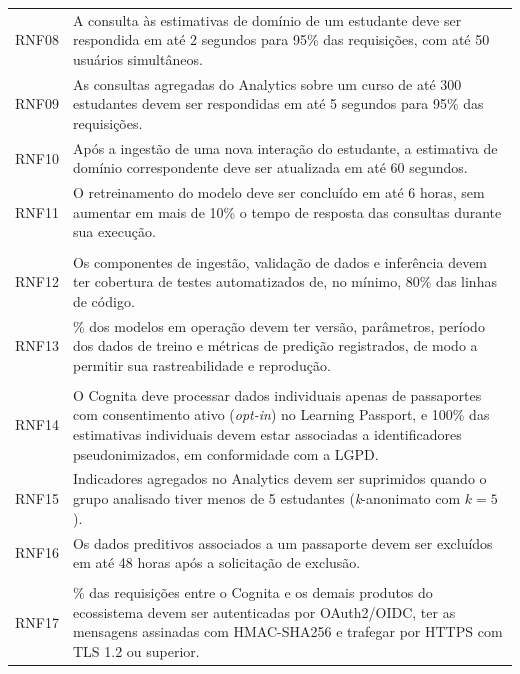 {\begin{longtable}{>{\raggedright\arraybackslash}p{2.0cm}>{\raggedright\arraybackslash}p{11.8cm}}
\hline
\multicolumn{2}{l}{\textbf{Desempenho}} \\
\hline
RNF08 & A consulta às estimativas de domínio de um estudante deve ser respondida em até 2 segundos para 95\% das requisições, com até 50 usuários simultâneos. \\
\hline
RNF09 & As consultas agregadas do Analytics sobre um curso de até 300 estudantes devem ser respondidas em até 5 segundos para 95\% das requisições. \\
\hline
RNF10 & Após a ingestão de uma nova interação do estudante, a estimativa de domínio correspondente deve ser atualizada em até 60 segundos. \\
\hline
RNF11 & O retreinamento do modelo deve ser concluído em até 6 horas, sem aumentar em mais de 10\% o tempo de resposta das consultas durante sua execução. \\
\hline
\multicolumn{2}{l}{\textbf{Suportabilidade}} \\
\hline
RNF12 & Os componentes de ingestão, validação de dados e inferência devem ter cobertura de testes automatizados de, no mínimo, 80\% das linhas de código. \\
\hline
RNF13 & 100\% dos modelos em operação devem ter versão, parâmetros, período dos dados de treino e métricas de predição registrados, de modo a permitir sua rastreabilidade e reprodução. \\
\hline
\multicolumn{2}{l}{\textbf{Restrições de Projeto}} \\
\hline
RNF14 & O Cognita deve processar dados individuais apenas de passaportes com consentimento ativo (\textit{opt-in}) no Learning Passport, e 100\% das estimativas individuais devem estar associadas a identificadores pseudonimizados, em conformidade com a LGPD. \\
\hline
RNF15 & Indicadores agregados no Analytics devem ser suprimidos quando o grupo analisado tiver menos de 5 estudantes (\textit{k}-anonimato com $k = 5$). \\
\hline
RNF16 & Os dados preditivos associados a um passaporte devem ser excluídos em até 48 horas após a solicitação de exclusão. \\
\hline
\multicolumn{2}{l}{\textbf{Restrições de Implementação}} \\
\hline
RNF17 & 100\% das requisições entre o Cognita e os demais produtos do ecossistema devem ser autenticadas por OAuth2/OIDC, ter as mensagens assinadas com HMAC-SHA256 e trafegar por HTTPS com TLS 1.2 ou superior. \\
\hline
\end{longtable}
}


